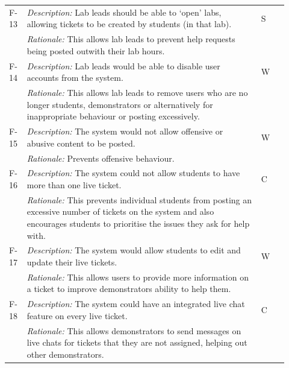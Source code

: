 \begin{table}[H]
\small
\begin{tabular}{|p{0.05\linewidth} | p{0.78\linewidth} |p{0.09\linewidth}|}
  
          \hline
 F-13 & \textit{Description:} Lab leads should be able to `open' labs, allowing tickets to be created by students (in that lab). & S\\
  \cline{2-2}
  & \textit{Rationale:} This allows lab leads to prevent help requests being posted outwith their lab hours. & \\

  
\hline\hline
 F-14 & \textit{Description:} Lab leads would be able to disable user accounts from the system. & W\\
  \cline{2-2}
  & \textit{Rationale:} This allows lab leads to remove users who are no longer students, demonstrators or alternatively for inappropriate behaviour or posting excessively. & \\
 
 \hline\hline
 F-15 & \textit{Description:} The system would not allow offensive or abusive content to be posted. & W\\
  \cline{2-2}
  & \textit{Rationale:} Prevents offensive behaviour. & \\
 
 \hline\hline
 F-16 & \textit{Description:} The system could not allow students to have more than one live ticket. & C\\
  \cline{2-2}
  & \textit{Rationale:} This prevents individual students from posting an excessive number of tickets on the system and also encourages students to prioritise the issues they ask for help with. & \\
 
  \hline\hline
 F-17 & \textit{Description:} The system would allow students to edit and update their live tickets. & W\\
  \cline{2-2}
  & \textit{Rationale:}  This allows users to provide more information on a ticket to improve demonstrators ability to help them. & \\
 
   \hline\hline
 F-18 & \textit{Description:} The system could have an integrated live chat feature on every live ticket. & C\\
  \cline{2-2}
  & \textit{Rationale:} This allows demonstrators to send messages on live chats for tickets that they are not assigned, helping out other demonstrators. & \\


\end{tabular}
\end{table}

